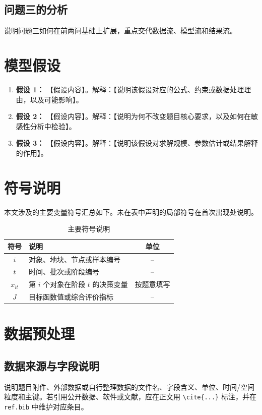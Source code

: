 \documentclass[withoutpreface,bwprint]{cumcmthesis}
\begin{document}
\subsection{问题三的分析}
说明问题三如何在前两问基础上扩展，重点交代数据流、模型流和结果流。

\section{模型假设}
\begin{enumerate}
  \item \textbf{假设 1：} 【假设内容】。解释：【说明该假设对应的公式、约束或数据处理理由，以及可能影响】。
  \item \textbf{假设 2：} 【假设内容】。解释：【说明为何不改变题目核心要求，以及如何在敏感性分析中检验】。
  \item \textbf{假设 3：} 【假设内容】。解释：【说明该假设对求解规模、参数估计或结果解释的作用】。
\end{enumerate}

\section{符号说明}
本文涉及的主要变量符号汇总如下。未在表中声明的局部符号在首次出现处说明。
\begin{table}[!htbp]
  \centering
  \caption{主要符号说明}
  \label{tab:symbols}
  \begin{tabularx}{\textwidth}{cXc}
    \toprule
    符号 & 说明 & 单位 \\
    \midrule
    $i$ & 对象、地块、节点或样本编号 & -- \\
    $t$ & 时间、批次或阶段编号 & -- \\
    $x_{it}$ & 第 $i$ 个对象在阶段 $t$ 的决策变量 & 按题意填写 \\
    $J$ & 目标函数值或综合评价指标 & -- \\
    \bottomrule
  \end{tabularx}
\end{table}

\section{数据预处理}
\subsection{数据来源与字段说明}
说明题目附件、外部数据或自行整理数据的文件名、字段含义、单位、时间/空间粒度和主键。若引用公开数据、软件或文献，应在正文用 \verb|\cite{...}| 标注，并在 \texttt{ref.bib} 中维护对应条目。
\end{document}
